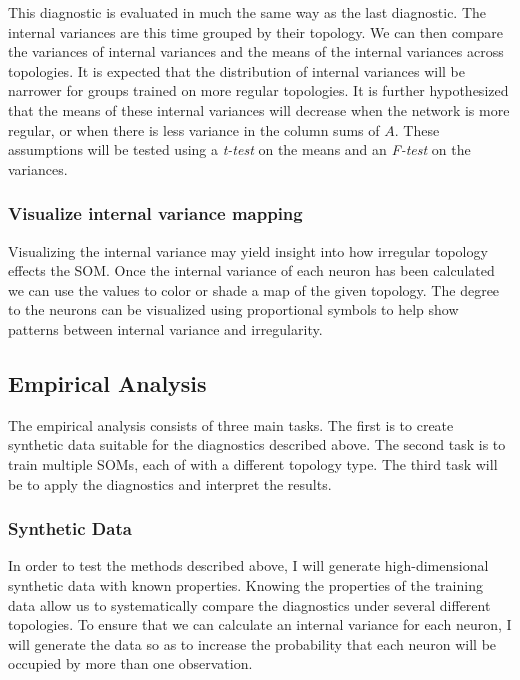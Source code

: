 \documentclass[10pt,titlepage]{article}
\begin{document}
This diagnostic is evaluated in much the same way as the last diagnostic.  
The internal variances are this time grouped by their topology.  We can then
compare the variances of internal variances and the means of the internal
variances across topologies.  It is expected that the distribution of internal
variances will be narrower for groups trained on more regular topologies.
It is further hypothesized that the means of these internal variances will
decrease when the network is more regular, or when there is less variance in
the column sums of $A$.  These assumptions will be tested using
a \emph{t-test} on the means and an \emph{F-test} on the variances.

\subsubsection{Visualize internal variance mapping}
Visualizing the internal variance may yield insight into how irregular topology
effects the SOM.  Once the internal variance of each neuron has been calculated
we can use the values to color or shade a map of the given topology.  The degree
to the neurons can be visualized using proportional symbols to help show
patterns between internal variance and irregularity.

\subsection{Empirical Analysis}
The empirical analysis consists of three main tasks.  The first is to create
synthetic data suitable for the diagnostics described above.  The second task is
to train multiple SOMs, each of with a different topology type. The third task
will be to apply the diagnostics and interpret the results.

\subsubsection{Synthetic Data}
In order to test the methods described above, I will generate high-dimensional
synthetic data with known properties.  Knowing the properties of the training
data allow us to systematically compare the diagnostics under several different
topologies.  To ensure that we can calculate an internal variance for each
neuron, I will generate the data so as to increase the probability that each
neuron will be occupied by more than one observation.
\end{document}
